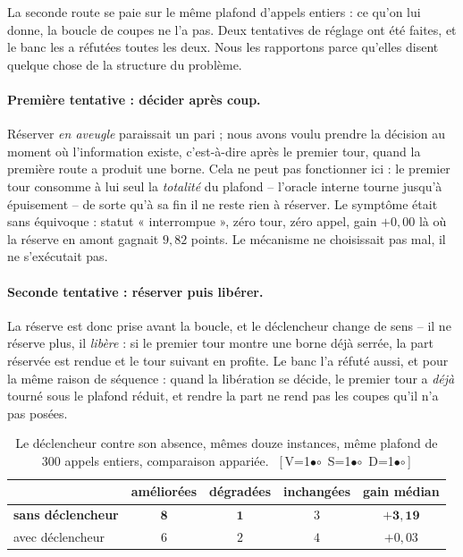 \documentclass[11pt,a4paper]{article}
\theoremstyle{plain}
\theoremstyle{remark}
\newcommand{\cfgm}[1]{\ifnum#1=1$\bullet$\else$\circ$\fi}
\newcommand{\conf}[3]{%
  \textsf{\footnotesize[\,V\cfgm{#1}\ S\cfgm{#2}\ D\cfgm{#3}\,]}}
\begin{document}
La seconde route se paie sur le même plafond d'appels entiers : ce qu'on lui
donne, la boucle de coupes ne l'a pas. Deux tentatives de réglage ont été
faites, et le banc les a réfutées toutes les deux. Nous les rapportons parce
qu'elles disent quelque chose de la structure du problème.

\paragraph{Première tentative : décider après coup.} Réserver \emph{en
aveugle} paraissait un pari ; nous avons voulu prendre la décision au moment
où l'information existe, c'est-à-dire après le premier tour, quand la
première route a produit une borne. Cela ne peut pas fonctionner ici : le
premier tour consomme à lui seul la \emph{totalité} du plafond -- l'oracle
interne tourne jusqu'à épuisement -- de sorte qu'à sa fin il ne reste rien à
réserver. Le symptôme était sans équivoque : statut « interrompue », zéro
tour, zéro appel, gain $+0{,}00$ là où la réserve en amont gagnait $9{,}82$
points. Le mécanisme ne choisissait pas mal, il ne s'exécutait pas.

\paragraph{Seconde tentative : réserver puis libérer.} La réserve est donc
prise avant la boucle, et le déclencheur change de sens -- il ne réserve
plus, il \emph{libère} : si le premier tour montre une borne déjà serrée, la
part réservée est rendue et le tour suivant en profite. Le banc l'a réfuté
aussi, et pour la même raison de séquence : quand la libération se décide,
le premier tour a \emph{déjà} tourné sous le plafond réduit, et rendre la
part ne rend pas les coupes qu'il n'a pas posées.

\begin{table}[H]
\centering
\caption{Le déclencheur contre son absence, mêmes douze instances, même
plafond de $300$ appels entiers, comparaison appariée.\ \conf{0}{1}{0}}
\label{tab:porte}
\begin{tabular}{lcccc}
\toprule
& améliorées & dégradées & inchangées & gain médian\\
\midrule
\textbf{sans déclencheur} & $\mathbf{8}$ & $\mathbf{1}$ & $3$
 & $\mathbf{+3{,}19}$\\
avec déclencheur & $6$ & $2$ & $4$ & $+0{,}03$\\
\bottomrule
\end{tabular}
\end{table}
\end{document}
